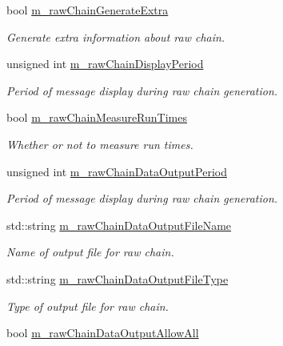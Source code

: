 \begin{DoxyCompactItemize}
bool \hyperlink{class_q_u_e_s_o_1_1_m_l_sampling_level_options_ab0dda87d92a759b277d07157def23174}{m\-\_\-raw\-Chain\-Generate\-Extra}
\begin{DoxyCompactList}\small\item\em Generate extra information about raw chain. \end{DoxyCompactList}\item 
unsigned int \hyperlink{class_q_u_e_s_o_1_1_m_l_sampling_level_options_a6d0e080a6b428a8e6c8fed14c597c883}{m\-\_\-raw\-Chain\-Display\-Period}
\begin{DoxyCompactList}\small\item\em Period of message display during raw chain generation. \end{DoxyCompactList}\item 
bool \hyperlink{class_q_u_e_s_o_1_1_m_l_sampling_level_options_ad93ee62195c418eedb55877009102cab}{m\-\_\-raw\-Chain\-Measure\-Run\-Times}
\begin{DoxyCompactList}\small\item\em Whether or not to measure run times. \end{DoxyCompactList}\item 
unsigned int \hyperlink{class_q_u_e_s_o_1_1_m_l_sampling_level_options_a8fdb68e6d3e91f0334293f2ee009aded}{m\-\_\-raw\-Chain\-Data\-Output\-Period}
\begin{DoxyCompactList}\small\item\em Period of message display during raw chain generation. \end{DoxyCompactList}\item 
std\-::string \hyperlink{class_q_u_e_s_o_1_1_m_l_sampling_level_options_ab89d7ed301a956f913058a8e5f63fbbd}{m\-\_\-raw\-Chain\-Data\-Output\-File\-Name}
\begin{DoxyCompactList}\small\item\em Name of output file for raw chain. \end{DoxyCompactList}\item 
std\-::string \hyperlink{class_q_u_e_s_o_1_1_m_l_sampling_level_options_a239091edd94cfa694c6c33591c1d1ba2}{m\-\_\-raw\-Chain\-Data\-Output\-File\-Type}
\begin{DoxyCompactList}\small\item\em Type of output file for raw chain. \end{DoxyCompactList}\item 
bool \hyperlink{class_q_u_e_s_o_1_1_m_l_sampling_level_options_a4e84fdd26bf87099d2b126f5fda379a6}{m\-\_\-raw\-Chain\-Data\-Output\-Allow\-All}

\end{DoxyCompactItemize}
